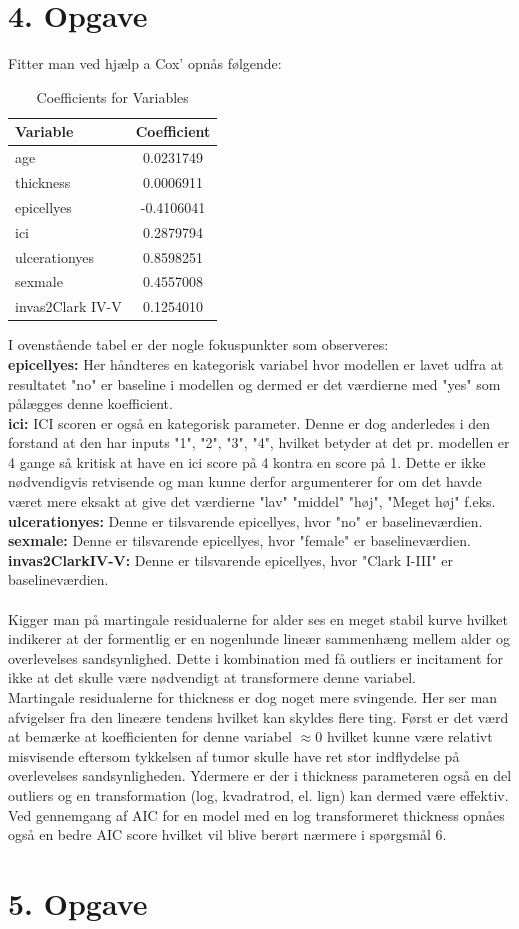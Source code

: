 \chapter{4. Opgave}
Fitter man ved hjælp a Cox' opnås følgende:
\begin{table}[H]
\centering
\begin{tabular}{|l|c|}
\hline
\textbf{Variable} & \textbf{Coefficient} \\
\hline
age & 0.0231749 \\
thickness & 0.0006911 \\
epicellyes & -0.4106041 \\
ici & 0.2879794 \\
ulcerationyes & 0.8598251 \\
sexmale & 0.4557008 \\
invas2Clark IV-V & 0.1254010 \\
\hline
\end{tabular}
\caption{Coefficients for Variables}
\label{tab:coefficients}
\end{table}
I ovenstående tabel er der nogle fokuspunkter som observeres:\\
\textbf{epicellyes:} Her håndteres en kategorisk variabel hvor modellen er lavet udfra at resultatet "no" er baseline i modellen og dermed er det værdierne med "yes" som pålægges denne koefficient.\\
\textbf{ici:} ICI scoren er også en kategorisk parameter. Denne er dog anderledes i den forstand at den har inputs "1", "2", "3", "4", hvilket betyder at det pr. modellen er 4 gange så kritisk at have en ici score på 4 kontra en score på 1. Dette er ikke nødvendigvis retvisende og man kunne derfor argumenterer for om det havde været mere eksakt at give det værdierne "lav" "middel" "høj", "Meget høj" f.eks.\\
\textbf{ulcerationyes:} Denne er tilsvarende epicellyes, hvor "no" er baselineværdien.\\
\textbf{sexmale:} Denne er tilsvarende epicellyes, hvor "female" er baselineværdien.\\
\textbf{invas2ClarkIV-V:} Denne er tilsvarende epicellyes, hvor "Clark I-III" er baselineværdien.\\\\
Kigger man på martingale residualerne for alder ses en meget stabil kurve hvilket indikerer at der formentlig er en nogenlunde lineær sammenhæng mellem alder og overlevelses sandsynlighed. Dette i kombination med få outliers er incitament for ikke at det skulle være nødvendigt at transformere denne variabel.\\
Martingale residualerne for thickness er dog noget mere svingende. Her ser man afvigelser fra den lineære tendens hvilket kan skyldes flere ting. Først er det værd at bemærke at koefficienten for denne variabel $\approx 0$ hvilket kunne være relativt misvisende eftersom tykkelsen af tumor skulle have ret stor indflydelse på overlevelses sandsynligheden. Ydermere er der i thickness parameteren også en del outliers og en transformation (log, kvadratrod, el. lign) kan dermed være effektiv. Ved gennemgang af AIC for en model med en log transformeret thickness opnåes også en bedre AIC score hvilket vil blive berørt nærmere i spørgsmål 6.

\chapter{5. Opgave}





